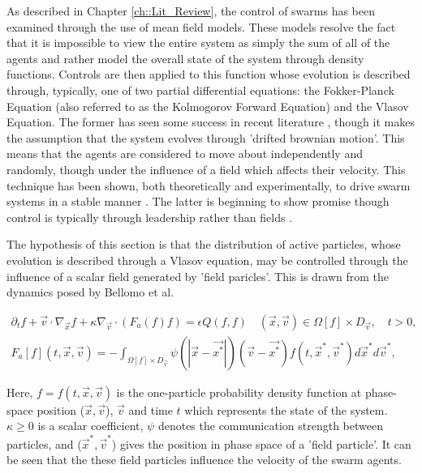 \documentclass[.../main.tex]{subfiles}
\begin{document}
    As described in Chapter \ref{ch::Lit_Review}, the control of swarms has been examined through the
    use of
    mean field models. These models resolve the fact that it is impossible to view the entire system
    as simply the sum of all of the agents and rather model the overall state of the system through
    density functions. Controls are then applied to this function whose evolution is described
    through, typically, one of two partial differential equations: the Fokker-Planck Equation (also
    referred to as the Kolmogorov Forward Equation) and the Vlasov Equation. The former has seen
    some success in recent literature \cite{Elamvazhuthi2019, Li2017,
    Roy2017}, though it makes the assumption that the system evolves through 'drifted
    brownian motion'. This means that the agents are considered to move about independently and
    randomly, though under the influence of a field which affects their velocity. This technique
	has been shown, both theoretically and experimentally, to drive swarm systems in a stable
	manner \cite{Fleig}. The latter is beginning to show promise 
	though control is typically through leadership rather than fields \cite{Burger2019}. 

	The hypothesis of this section is that the distribution of active particles, whose evolution is
	described through a Vlasov equation, may be controlled through the influence of a scalar field
	generated by 'field paricles'. This is drawn from the dynamics posed by Bellomo et al. 
	\cite{Bellomo2017}

	\begin{equation}
	\label{eqn::Vlasov}
    \begin{split}    
        \partial_t f + \Vec{v} \cdot \nabla_{\Vec{x}} f + \kappa \nabla_{\Vec{v}} \cdot (F_a (f) f)
        = \epsilon Q(f, f) \quad  (\Vec{x}, \Vec{v}) \in \Omega[f] \times D_{\Vec{v}}, \quad t>0, \\
        F_a[f](t, \Vec{x}, \Vec{v}) = - \int_{\Omega [f] \times D_{\Vec{v}}} \psi (|\Vec{x} - \Vec
        {x^*}|)(\Vec{v} - \Vec{x^*}) f(t, \Vec{x}^*, \Vec{v}^*) d\Vec{x}^* d\Vec{v}^*, 
    \end{split}
    \end{equation}


    Here, $f = f(t, \Vec{x}, \Vec{v})$ is the one-particle probability density function at
    phase-space position ($\Vec{x}, \Vec{v}$), $\Vec{v}$ and time $t$ which represents the state of
    the system. $\kappa \geq 0$ is a scalar
    coefficient, $\psi$ denotes the communication strength between particles, and ($\Vec{x}^*, \Vec
    {v}^*$) gives the position in phase space of a 'field particle'. It can be seen that the these
    field particles influence the velocity of the swarm agents.
\end{document}
